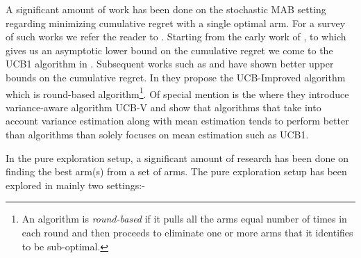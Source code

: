 A significant amount of work has been done on the stochastic MAB setting regarding minimizing cumulative regret with a single optimal arm. For a survey of such works we refer the reader to \cite{bubeck2012regret}. Starting from the early work of \cite{thompson1933likelihood}, \cite{robbins1952some} to \cite{lai1985asymptotically} which gives us an asymptotic lower bound on the cumulative regret we come to the UCB1 algorithm in  \cite{auer2002finite}. Subsequent works such as \cite{audibert2009minimax} and \cite{auer2010ucb} have shown better upper bounds on the cumulative regret. In \cite{auer2010ucb} they propose the UCB-Improved algorithm which is round-based algorithm\footnote{An algorithm is \textit{round-based} if it pulls all the arms equal number of times in each round and then proceeds to eliminate one or more arms that it identifies to be sub-optimal.}. Of special mention is the \cite{audibert2009exploration} where they introduce variance-aware algorithm UCB-V and show that algorithms that take into account variance estimation along with mean estimation tends to perform better than algorithms than solely focuses on mean estimation such as UCB1.


	
	In the pure exploration setup, a significant amount of research has been done on finding the best arm(s) from a set of arms. The pure exploration setup has been explored in mainly two settings:-
	
